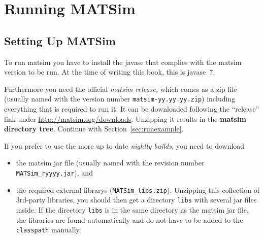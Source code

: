 
\section{Running MATSim}
\label{sec:runningmatsim}

\subsection{Setting Up MATSim}
\label{sec:settingUpMatsim}

To run \gls{matsim} you have to install the \gls{javase} that complies with the \gls{matsim} version to be run. At the time of writing this book, this is \gls{javase}~7.

Furthermore you need the official \emph{\gls{matsim} release,} which comes as a zip file (usually named with the version number \lstinline|matsim-yy.yy.yy.zip|) including everything that is required to run it. It can be downloaded following the ``release'' link under \url{http://matsim.org/downloads}.
Unzipping it results in the \textbf{\gls{matsim} directory tree}. Continue with Section~\ref{sec:runexample}.

If you prefer to use the more up to date \emph{nightly builds,} you need to download
\begin{itemize}\styleItemize
\item the \gls{matsim} \gls{jar} file (usually named with the revision number \lstinline|MATSim_ryyyy.jar|), and
\item the required external \glspl{library} (\lstinline|MATSim_libs.zip|). 
Unzipping this collection of 3rd-party libraries, you should then get a directory \lstinline|libs| with several \gls{jar} files inside. If the directory \lstinline|libs| is in the same directory as the \gls{matsim} \gls{jar} file, the libraries are found automatically and do not have to be added to the \lstinline|classpath| manually.
\end{itemize}


